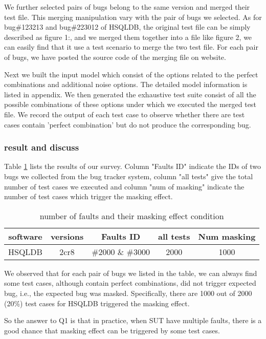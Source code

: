 \documentclass{sig-alternate}
\begin{document}
We further selected pairs of bugs belong to the same version and merged their test file. This merging manipulation vary with the pair of bugs we selected. As for bug\#123213 and  bug\#223012 of HSQLDB, the original test file can be simply described as figure 1:, and we merged them together into a file like figure 2, we can easily find that it use a test scenario to merge the two test file. For each pair of bugs, we have posted the source code of the merging file on website.

Next we built the input model which consist of the options related to the perfect combinations and additional noise options. The detailed model information is listed in appendix. We then generated the exhaustive test suite consist of all the possible combinations of these options under which we executed the merged test file. We record the output of each test case to observe whether there are test cases contain 'perfect combination' but do not produce the corresponding bug.

\subsubsection{result and discuss}

Table \ref{masking effect condition} lists the results of our survey. Column "Faults ID" indicate the IDs of two bugs we collected from the bug tracker system, column "all tests" give the total number of test cases we executed and column "num of masking" indicate the number of test cases which trigger the masking effect. 

\begin{table}\renewcommand{\arraystretch}{1.3}
\caption{number of faults and their masking effect condition}
\label{masking effect condition}
\begin{tabular}{c|c|c|c|c} \hline
software & versions & Faults ID  & all tests & Num masking\\ \hline
HSQLDB & 2cr8 & \#2000 \&  \#3000 & 2000 & 1000\\ \hline
\hline\end{tabular}
\end{table}

We observed that for each pair of bugs we listed in the table, we can always find some test cases, although contain perfect combinations, did not trigger expected bug, i.e., the expected bug was masked. Specifically, there are 1000 out of 2000 (20\%) test cases for HSQLDB triggered the masking effect.

So the answer to Q1 is that in practice, when SUT have multiple faults, there is a good chance that masking effect can be triggered by some test cases.
\end{document}
